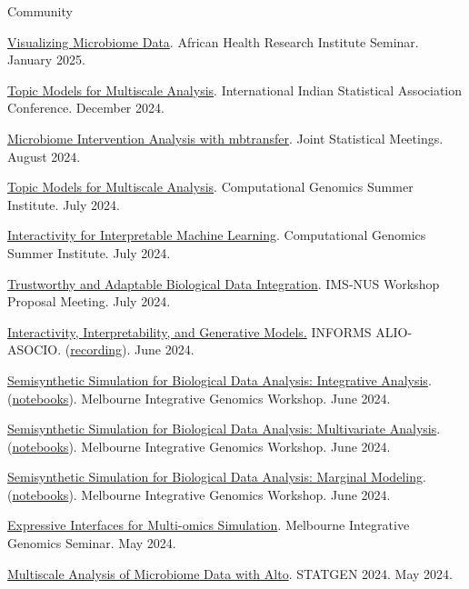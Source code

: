 \documentclass[letterpaper]{article}
\renewenvironment{itemize}{
  \begin{list}{}{
    \setlength{\leftmargin}{1.5em}
  }
}{
  \end{list}
}
\begin{document}
Community
\begin{itemize}
  \item \href{https://krisrs1128.github.io/talks/2025/20250115/20250115.html}{Visualizing Microbiome Data}. African Health Research Institute Seminar. January 2025.
  \item \href{https://go.wisc.edu/337726}{Topic Models for Multiscale Analysis}. International Indian Statistical Association Conference. December 2024.
  \item \href{https://go.wisc.edu/h5ow0o}{Microbiome Intervention Analysis with mbtransfer}. Joint Statistical Meetings. August 2024.
  \item \href{https://go.wisc.edu/6y38gg}{Topic Models for Multiscale Analysis}. Computational Genomics Summer Institute. July 2024.
  \item \href{https://go.wisc.edu/pl9a65}{Interactivity for Interpretable Machine Learning}. Computational Genomics Summer Institute. July 2024.
  \item \href{https://go.wisc.edu/8k8r2q}{Trustworthy and Adaptable Biological Data Integration}. IMS-NUS Workshop Proposal Meeting. July 2024.
  \item \href{https://go.wisc.edu/3u4m16}{Interactivity, Interpretability, and Generative Models.} INFORMS ALIO-ASOCIO. (\href{https://www.youtube.com/watch?v=UaYfwzkWq1Q&feature=youtu.be}{recording}). June 2024.
  \item \href{https://go.wisc.edu/54tmr9}{Semisynthetic Simulation for Biological Data Analysis: Integrative Analysis}. (\href{https://github.com/krisrs1128/intro-to-simulation/}{notebooks}). Melbourne Integrative Genomics Workshop. June 2024.
  \item \href{https://go.wisc.edu/rc776i}{Semisynthetic Simulation for Biological Data Analysis: Multivariate Analysis}. (\href{https://github.com/krisrs1128/intro-to-simulation/}{notebooks}). Melbourne Integrative Genomics Workshop. June 2024.
  \item \href{https://go.wisc.edu/gfj36r}{Semisynthetic Simulation for Biological Data Analysis: Marginal Modeling}. (\href{https://github.com/krisrs1128/intro-to-simulation/}{notebooks}). Melbourne Integrative Genomics Workshop. June 2024.
  \item \href{https://krisrs1128.github.io/talks/2024/20240531/20240531.html#1}{Expressive Interfaces for Multi-omics Simulation}. Melbourne Integrative Genomics Seminar. May 2024.
  \item \href{https://krisrs1128.github.io/talks/2024/20240503/20240503.html#1}{Multiscale Analysis of Microbiome Data with Alto}. STATGEN 2024. May 2024.

\end{itemize}
\end{document}
